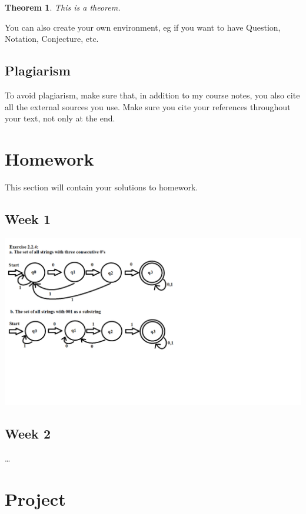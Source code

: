 \documentclass{article}
\theoremstyle{theorem}
\newtheorem{theorem}{Theorem}[section]
\theoremstyle{definition}
\theoremstyle{remark}
\begin{document}
\begin{theorem}
This is a theorem.
\end{theorem}

\noindent You can also create your own environment, eg if you want to have Question, Notation, Conjecture, etc.

\subsection{Plagiarism}

To avoid plagiarism, make sure that, in addition to my course notes, you also cite all the external sources you use. Make sure you cite your references throughout your text, not only at the end.

\section{Homework}\label{homework}

This section will contain your solutions to homework. 

\subsection{Week 1}

\includegraphics[scale=0.4]{Images/Homework1.png}

\subsection{Week 2}

\ldots

\section{Project}
\end{document}
